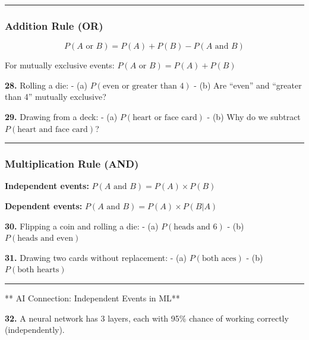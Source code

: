 \documentclass[
  11pt,
]{article}
\begin{document}
\begin{center}\rule{0.5\linewidth}{0.5pt}\end{center}

\hypertarget{addition-rule-or}{%
\subsubsection{Addition Rule (OR)}\label{addition-rule-or}}

\[P(A \text{ or } B) = P(A) + P(B) - P(A \text{ and } B)\]

For mutually exclusive events: \(P(A \text{ or } B) = P(A) + P(B)\)

\textbf{28.} Rolling a die: - (a) \(P(\text{even or greater than 4})\) -
(b) Are ``even'' and ``greater than 4'' mutually exclusive?

\textbf{29.} Drawing from a deck: - (a) \(P(\text{heart or face card})\)
- (b) Why do we subtract \(P(\text{heart and face card})\)?

\begin{center}\rule{0.5\linewidth}{0.5pt}\end{center}

\hypertarget{multiplication-rule-and}{%
\subsubsection{Multiplication Rule
(AND)}\label{multiplication-rule-and}}

\textbf{Independent events:} \(P(A \text{ and } B) = P(A) \times P(B)\)

\textbf{Dependent events:} \(P(A \text{ and } B) = P(A) \times P(B|A)\)

\textbf{30.} Flipping a coin and rolling a die: - (a)
\(P(\text{heads and 6})\) - (b) \(P(\text{heads and even})\)

\textbf{31.} Drawing two cards without replacement: - (a)
\(P(\text{both aces})\) - (b) \(P(\text{both hearts})\)

\begin{center}\rule{0.5\linewidth}{0.5pt}\end{center}

** AI Connection: Independent Events in ML**

\textbf{32.} A neural network has 3 layers, each with 95\% chance of
working correctly (independently).
\end{document}
